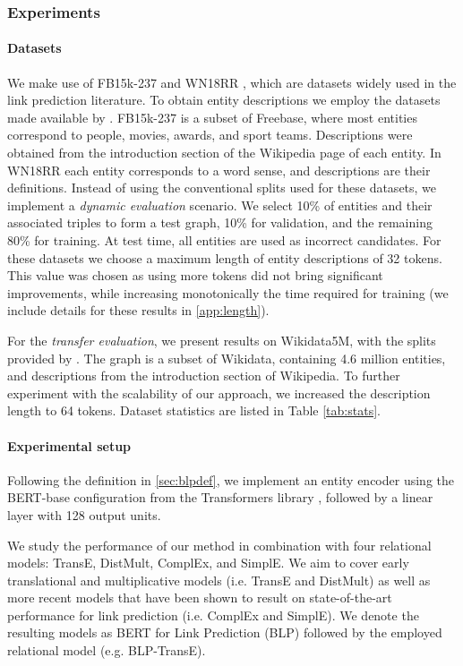 \documentclass[sigconf]{acmart}
\begin{document}
\subsubsection{Experiments}

\paragraph{Datasets} We make use of FB15k-237 \citep{toutanova2015observed} and WN18RR \citep{dettmers2018convolutional}, which are datasets widely used in the link prediction literature. To obtain entity descriptions we employ the datasets made available by \citet{yao2019kg}. FB15k-237 is a subset of Freebase, where most entities correspond to people, movies, awards, and sport teams. Descriptions were obtained from the introduction section of the Wikipedia page of each entity. In WN18RR each entity corresponds to a word sense, and descriptions are their definitions. Instead of using the conventional splits used for these datasets, we implement a \textit{dynamic evaluation} scenario. We select 10\% of entities and their associated triples to form a test graph, 10\% for validation, and the remaining 80\% for training. At test time, all entities are used as incorrect candidates. For these datasets we choose a maximum length of entity descriptions of 32 tokens. This value was chosen as using more tokens did not bring significant improvements, while increasing monotonically the time required for training (we include details for these results in \autoref{app:length}).

For the \textit{transfer evaluation}, we present results on Wikidata5M, with the splits provided by \citet{wang2019kepler}. The graph is a subset of Wikidata, containing 4.6 million entities, and descriptions from the introduction section of Wikipedia. To further experiment with the scalability of our approach, we increased the description length to 64 tokens. Dataset statistics are listed in Table \ref{tab:stats}.

\paragraph{Experimental setup} Following the definition in \autoref{sec:blpdef}, we implement an entity encoder using the BERT-base configuration from the Transformers library \citep{Wolf2019HuggingFacesTS}, followed by a linear layer with 128 output units. 

We study the performance of our method in combination with four relational models: TransE, DistMult, ComplEx, and SimplE. We aim to cover early translational and multiplicative models (i.e. TransE and DistMult) as well as more recent models that have been shown to result on state-of-the-art performance for link prediction \cite{ruffinelli2020you} (i.e. ComplEx and SimplE). We denote the resulting models as BERT for Link Prediction (BLP) followed by the employed relational model (e.g. BLP-TransE).
\end{document}
